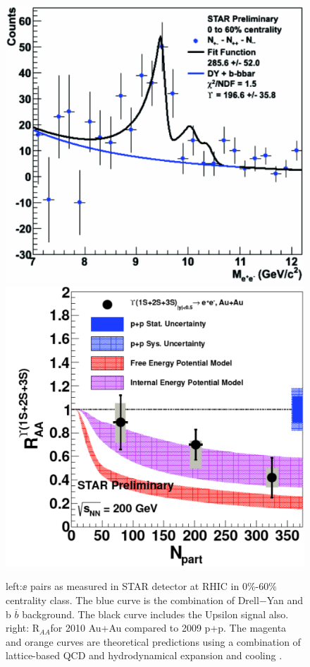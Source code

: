 \begin{figure}
  \includegraphics[width=\smallfigwidth]{chap_QuarkoniaSurvey_figures/YStar2011_InvMass}
  \includegraphics[width=\smallfigwidth]{chap_QuarkoniaSurvey_figures/YStar2011}
  \caption[]{left:$\ee$ pairs as measured in STAR detector at RHIC in 0$\%$-60$\%$ centrality class. The blue curve is the combination of Drell$-$Yan and b $\overline {b}$ 
    background. The black curve includes the Upsilon signal also. right: R$_{AA}$for 2010 Au+Au compared to 2009 p+p. The magenta and orange curves are theoretical 
    predictions using a combination of lattice-based QCD and hydrodynamical expansion and cooling \cite{Star12}.}
  \label{fig:YinSTAR}
\end{figure}




